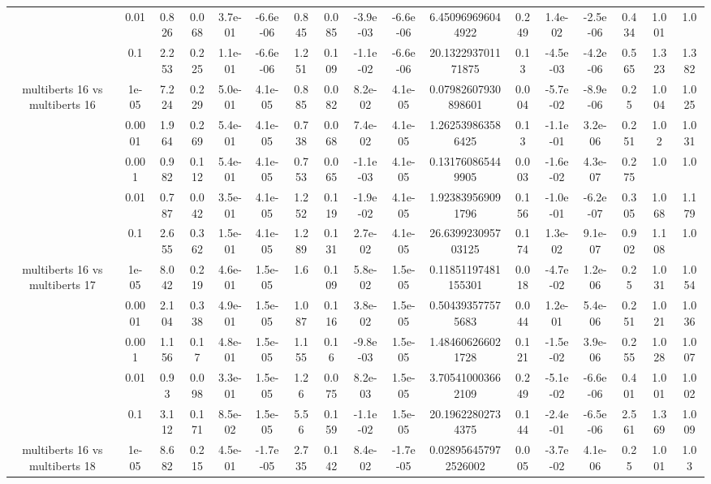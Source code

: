 \begin{tabular}{|c|c|c|c|c|c|c|c|c|c|c|c|c|c|c|c|c|}
 & 0.01 & 0.826 & 0.068 & 3.7e-01 & -6.6e-06 & 0.845 & 0.085 & -3.9e-03 & -6.6e-06 & 6.450969696044922 & 0.249 & 1.4e-02 & -2.5e-06 & 0.434 & 1.001 & 1.0 \\
 & 0.1 & 2.253 & 0.225 & 1.1e-01 & -6.6e-06 & 1.251 & 0.109 & -1.1e-02 & -6.6e-06 & 20.132293701171875 & 0.13 & -4.5e-03 & -4.2e-06 & 0.565 & 1.323 & 1.382 \\
\hline
\multirow{5}{*}{multiberts 16 vs multiberts 16} & 1e-05 & 7.224 & 0.229 & 5.0e-01 & 4.1e-05 & 0.885 & 0.082 & 8.2e-02 & 4.1e-05 & 0.07982607930898601 & 0.004 & -5.7e-02 & -8.9e-06 & 0.25 & 1.004 & 1.025 \\
 & 0.0001 & 1.964 & 0.269 & 5.4e-01 & 4.1e-05 & 0.738 & 0.068 & 7.4e-02 & 4.1e-05 & 1.262539863586425 & 0.13 & -1.1e-01 & 3.2e-06 & 0.251 & 1.02 & 1.031 \\
 & 0.001 & 0.982 & 0.112 & 5.4e-01 & 4.1e-05 & 0.753 & 0.065 & -1.1e-03 & 4.1e-05 & 0.131760865449905 & 0.003 & -1.6e-02 & 4.3e-07 & 0.275 & 1.0 & 1.0 \\
 & 0.01 & 0.787 & 0.042 & 3.5e-01 & 4.1e-05 & 1.252 & 0.119 & -1.9e-02 & 4.1e-05 & 1.923839569091796 & 0.156 & -1.0e-01 & -6.2e-07 & 0.305 & 1.068 & 1.179 \\
 & 0.1 & 2.655 & 0.362 & 1.5e-01 & 4.1e-05 & 1.289 & 0.131 & 2.7e-02 & 4.1e-05 & 26.639923095703125 & 0.174 & 1.3e-02 & 9.1e-07 & 0.902 & 1.108 & 1.0 \\
\hline
\multirow{5}{*}{multiberts 16 vs multiberts 17} & 1e-05 & 8.042 & 0.219 & 4.6e-01 & 1.5e-05 & 1.6 & 0.109 & 5.8e-02 & 1.5e-05 & 0.11851197481155301 & 0.018 & -4.7e-02 & 1.2e-06 & 0.25 & 1.031 & 1.054 \\
 & 0.0001 & 2.104 & 0.338 & 4.9e-01 & 1.5e-05 & 1.087 & 0.116 & 3.8e-02 & 1.5e-05 & 0.504393577575683 & 0.044 & 1.2e-01 & 5.4e-06 & 0.251 & 1.021 & 1.036 \\
 & 0.001 & 1.156 & 0.17 & 4.8e-01 & 1.5e-05 & 1.155 & 0.16 & -9.8e-03 & 1.5e-05 & 1.484606266021728 & 0.121 & -1.5e-02 & 3.9e-06 & 0.255 & 1.028 & 1.007 \\
 & 0.01 & 0.93 & 0.098 & 3.3e-01 & 1.5e-05 & 1.26 & 0.075 & 8.2e-03 & 1.5e-05 & 3.705410003662109 & 0.249 & -5.1e-02 & -6.6e-06 & 0.401 & 1.001 & 1.002 \\
 & 0.1 & 3.112 & 0.171 & 8.5e-02 & 1.5e-05 & 5.56 & 0.159 & -1.1e-02 & 1.5e-05 & 20.19622802734375 & 0.144 & -2.4e-01 & -6.5e-06 & 2.561 & 1.369 & 1.009 \\
\hline
\multirow{5}{*}{multiberts 16 vs multiberts 18} & 1e-05 & 8.682 & 0.215 & 4.5e-01 & -1.7e-05 & 2.735 & 0.142 & 8.4e-02 & -1.7e-05 & 0.028956457972526002 & 0.005 & -3.7e-02 & 4.1e-06 & 0.25 & 1.001 & 1.03 \\

\end{tabular}
